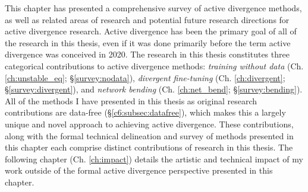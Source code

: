 This chapter has presented a comprehensive survey of active divergence methods, as well as related areas of research and potential future research directions for active divergence research. 
Active divergence has been the primary goal of all of the research in this thesis, even if it was done primarily before the term active divergence was conceived in 2020. 
The research in this thesis constitutes three categorical contributions to active divergence methods: \textit{training without data} (Ch. \ref{ch:unstable_eq}; \S \ref{survey:nodata}), \textit{divergent fine-tuning} (Ch. \ref{ch:divergent}; \S \ref{survey:divergent}), and \textit{network bending} (Ch. \ref{ch:net_bend}; \S \ref{survey:bending}). 
All of the methods I have presented in this thesis as original research contributions are data-free (\S \ref{c6:subsec:datafree}), which makes this a largely unique and novel approach to achieving active divergence. 
These contributions, along with the formal technical delineation and survey of methods presented in this chapter each comprise distinct contributions of research in this thesis.
The following chapter (Ch. \ref{ch:impact}) details the artistic and technical impact of my work outside of the formal active divergence perspective presented in this chapter. 
